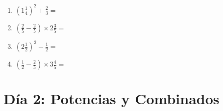 \documentclass[12pt]{article}
\begin{document}
\begin{enumerate}
\item \large $ \left( 1 \frac{1}{4} \right)^2 + \frac{2}{3} = $ \vspace{1.6cm}
\item \large $ \left( \frac{2}{5} - \frac{2}{5} \right) \times 2 \frac{3}{5} = $ \vspace{1.6cm}
\item \large $ \left( 2 \frac{1}{2} \right)^2 - \frac{1}{2} = $ \vspace{1.6cm}
\item \large $ \left( \frac{1}{2} - \frac{2}{5} \right) \times 3 \frac{4}{5} = $ \vspace{1.6cm}
\end{enumerate}\newpage
\section*{Día 2: Potencias y Combinados}
\end{document}
